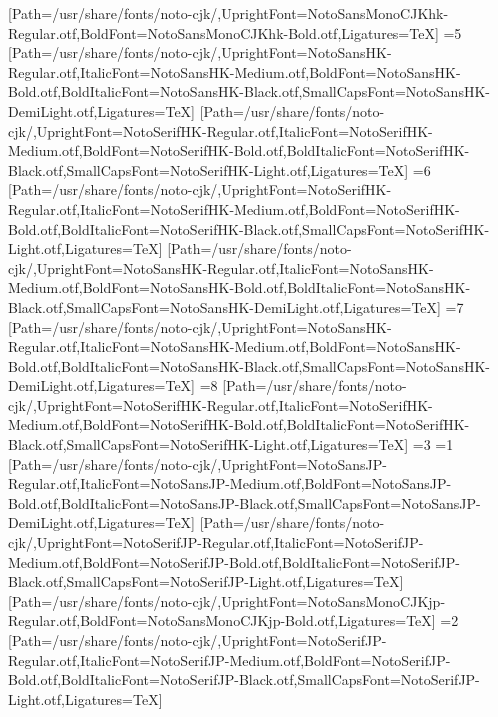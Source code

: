 [Path=/usr/share/fonts/noto-cjk/,UprightFont=NotoSansMonoCJKhk-Regular.otf,BoldFont=NotoSansMonoCJKhk-Bold.otf,Ligatures=TeX]
\else\ifnum\value{CJKFonts}=5
[Path=/usr/share/fonts/noto-cjk/,UprightFont=NotoSansHK-Regular.otf,ItalicFont=NotoSansHK-Medium.otf,BoldFont=NotoSansHK-Bold.otf,BoldItalicFont=NotoSansHK-Black.otf,SmallCapsFont=NotoSansHK-DemiLight.otf,Ligatures=TeX]
[Path=/usr/share/fonts/noto-cjk/,UprightFont=NotoSerifHK-Regular.otf,ItalicFont=NotoSerifHK-Medium.otf,BoldFont=NotoSerifHK-Bold.otf,BoldItalicFont=NotoSerifHK-Black.otf,SmallCapsFont=NotoSerifHK-Light.otf,Ligatures=TeX]
\else\ifnum\value{CJKFonts}=6
[Path=/usr/share/fonts/noto-cjk/,UprightFont=NotoSerifHK-Regular.otf,ItalicFont=NotoSerifHK-Medium.otf,BoldFont=NotoSerifHK-Bold.otf,BoldItalicFont=NotoSerifHK-Black.otf,SmallCapsFont=NotoSerifHK-Light.otf,Ligatures=TeX]
[Path=/usr/share/fonts/noto-cjk/,UprightFont=NotoSansHK-Regular.otf,ItalicFont=NotoSansHK-Medium.otf,BoldFont=NotoSansHK-Bold.otf,BoldItalicFont=NotoSansHK-Black.otf,SmallCapsFont=NotoSansHK-DemiLight.otf,Ligatures=TeX]
\else\ifnum\value{CJKFonts}=7
[Path=/usr/share/fonts/noto-cjk/,UprightFont=NotoSansHK-Regular.otf,ItalicFont=NotoSansHK-Medium.otf,BoldFont=NotoSansHK-Bold.otf,BoldItalicFont=NotoSansHK-Black.otf,SmallCapsFont=NotoSansHK-DemiLight.otf,Ligatures=TeX]
\else\ifnum\value{CJKFonts}=8
[Path=/usr/share/fonts/noto-cjk/,UprightFont=NotoSerifHK-Regular.otf,ItalicFont=NotoSerifHK-Medium.otf,BoldFont=NotoSerifHK-Bold.otf,BoldItalicFont=NotoSerifHK-Black.otf,SmallCapsFont=NotoSerifHK-Light.otf,Ligatures=TeX]
\fi\fi\fi\fi\fi\fi\fi\fi\else
\ifnum\value{CJKLanguage}=3
\ifnum\value{CJKFonts}=1
[Path=/usr/share/fonts/noto-cjk/,UprightFont=NotoSansJP-Regular.otf,ItalicFont=NotoSansJP-Medium.otf,BoldFont=NotoSansJP-Bold.otf,BoldItalicFont=NotoSansJP-Black.otf,SmallCapsFont=NotoSansJP-DemiLight.otf,Ligatures=TeX]
[Path=/usr/share/fonts/noto-cjk/,UprightFont=NotoSerifJP-Regular.otf,ItalicFont=NotoSerifJP-Medium.otf,BoldFont=NotoSerifJP-Bold.otf,BoldItalicFont=NotoSerifJP-Black.otf,SmallCapsFont=NotoSerifJP-Light.otf,Ligatures=TeX]
[Path=/usr/share/fonts/noto-cjk/,UprightFont=NotoSansMonoCJKjp-Regular.otf,BoldFont=NotoSansMonoCJKjp-Bold.otf,Ligatures=TeX]
\else\ifnum\value{CJKFonts}=2
[Path=/usr/share/fonts/noto-cjk/,UprightFont=NotoSerifJP-Regular.otf,ItalicFont=NotoSerifJP-Medium.otf,BoldFont=NotoSerifJP-Bold.otf,BoldItalicFont=NotoSerifJP-Black.otf,SmallCapsFont=NotoSerifJP-Light.otf,Ligatures=TeX]
